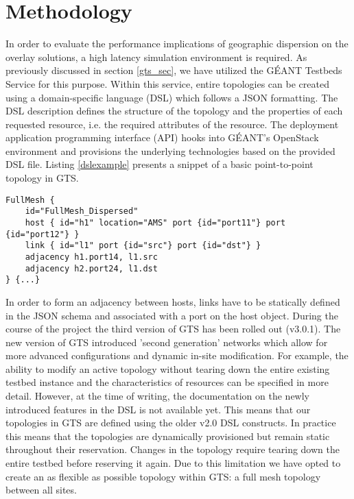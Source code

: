 \section{Methodology} \label{methodology}
In order to evaluate the performance implications of geographic dispersion on the overlay solutions, a high latency simulation environment is required. As previously discussed in section \ref{gts_sec}, we have utilized the GÉANT Testbeds Service for this purpose. Within this service, entire topologies can be created using a domain-specific language (DSL) which follows a JSON formatting. The DSL description defines the structure of the topology and the properties of each requested resource, i.e. the required attributes of the resource. The deployment application programming interface (API) hooks into GÉANT's OpenStack environment and provisions the underlying technologies based on the provided DSL file. Listing \ref{dslexample} presents a snippet of a basic point-to-point topology in GTS. 
\\
\begin{lstlisting}[caption={DSL example illustrating a simple host resource definition},label=dslexample]
FullMesh {
	id="FullMesh_Dispersed"
	host { id="h1" location="AMS" port {id="port11"} port {id="port12"} }
	link { id="l1" port {id="src"} port {id="dst"} }
	adjacency h1.port14, l1.src
	adjacency h2.port24, l1.dst
} {...}
\end{lstlisting}

In order to form an adjacency between hosts, links have to be statically defined in the JSON schema and associated with a port on the host object. During the course of the project the third version of GTS has been rolled out (v3.0.1). The new version of GTS introduced 'second generation' networks which allow for more advanced configurations and dynamic in-site modification. For example, the ability to modify an active topology without tearing down the entire existing testbed instance and the characteristics of resources can be specified in more detail. However, at the time of writing, the documentation on the newly introduced features in the DSL is not available yet. This means that our topologies in GTS are defined using the older v2.0 DSL constructs. In practice this means that the topologies are dynamically provisioned but remain static throughout their reservation. Changes in the topology require tearing down the entire testbed before reserving it again. Due to this limitation we have opted to create an as flexible as possible topology within GTS: a full mesh topology between all sites. 

